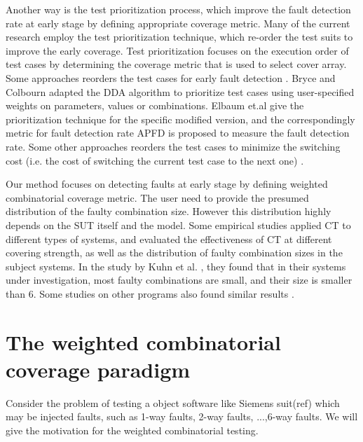 \documentclass[10pt,conference, compsocconf]{IEEEtran}
\begin{document}
\begin{CJK}{UTF8}{gkai}
Another way is the test prioritization process,
which improve the fault detection rate at early
stage by defining appropriate coverage metric.
Many of the current research employ the test prioritization technique,
which re-order the test suits to improve the early coverage.
Test prioritization focuses on the execution order of test cases by determining
the coverage metric that is used to select cover array.
Some approaches reorders the test cases for early fault detection
\cite{qu07ICSM,qu08ISSTA,qu13ICSTW}. Bryce and Colbourn \cite{bryce06IST}
adapted the DDA algorithm to prioritize test cases using user-specified weights
on parameters, values or combinations.
Elbaum et.al give the prioritization technique for the specific modified
version, and the correspondingly metric for fault detection rate APFD 
is proposed to measure the fault detection rate.
Some other approaches reorders the test
cases to minimize the switching cost (i.e. the cost of switching the current
test case to the next one) \cite{kimoto08SSIRI,srikanth09ISSRE,wu14ICSTW}.


Our method focuses on detecting faults at early stage by defining
weighted combinatorial coverage metric.
The user need to provide the presumed distribution of the faulty
combination size. However this distribution highly depends on the SUT itself and
the model.  Some empirical studies applied CT to different types of systems, and
evaluated the effectiveness of CT at different covering strength, as well as the
distribution of faulty combination sizes in the subject systems. In the study by
Kuhn et al. \cite{kuhn02SEW,kuhn04TSE}, they found that in their systems under
investigation, most faulty combinations are small, and their size is smaller
than 6. Some studies on other programs also found similar results
\cite{zhang11ISSTA,vilkomir13ICSTW}. 


\section{The weighted combinatorial coverage paradigm}
\label{sec:weight definition}
Consider the problem of testing a object software like Siemens suit(ref) which may
be injected faults, such as 1-way faults, 2-way faults, ...,6-way faults. 
We will give the motivation for the weighted combinatorial testing. 

\end{CJK}
\end{document}
